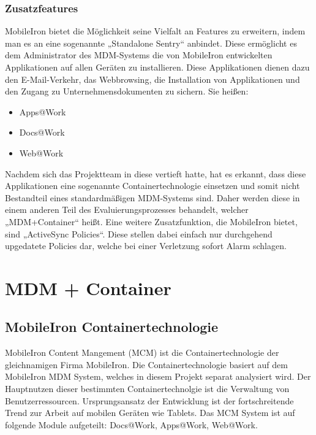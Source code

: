 \subsubsection{Zusatzfeatures}
MobileIron bietet die Möglichkeit seine Vielfalt an Features zu erweitern, indem man es an eine sogenannte „Standalone Sentry“ anbindet. Diese ermöglicht es dem Administrator des MDM-Systems die von MobileIron entwickelten Applikationen auf allen Geräten zu installieren. Diese Applikationen dienen dazu den E-Mail-Verkehr, das Webbrowsing, die Installation von Applikationen und den Zugang zu Unternehmensdokumenten zu sichern. Sie heißen:
\begin{itemize}
	\item Apps@Work
	\item Docs@Work
	\item Web@Work
\end{itemize}
Nachdem sich das Projektteam in diese vertieft hatte, hat es erkannt, dass diese Applikationen eine sogenannte Containertechnologie einsetzen und somit nicht Bestandteil eines standardmäßigen MDM-Systems sind. Daher werden diese in einem anderen Teil des Evaluierungsprozesses behandelt, welcher „MDM+Container“ heißt. Eine weitere Zusatzfunktion, die MobileIron bietet, sind „ActiveSync Policies“. Diese stellen dabei einfach nur durchgehend upgedatete Policies dar, welche bei einer Verletzung sofort Alarm schlagen.



\section{MDM + Container}
\subsection{MobileIron Containertechnologie}
MobileIron Content Mangement (MCM) ist die Containertechnologie der gleichnamigen Firma MobileIron. Die Containertechnologie basiert auf dem MobileIron MDM System, welches in diesem Projekt separat analysiert wird. \newline
Der Hauptnutzen dieser bestimmten Containertechnolgie ist die Verwaltung von Benutzerressourcen. Ursprungsansatz der Entwicklung ist der fortschreitende Trend zur Arbeit auf mobilen Geräten wie Tablets. Das MCM System ist auf folgende Module aufgeteilt: Docs@Work, Apps@Work, Web@Work.

